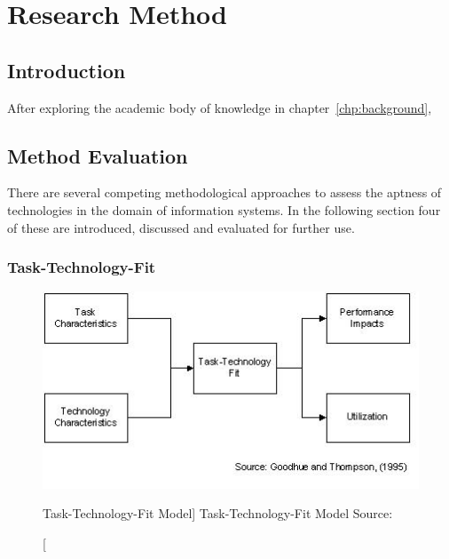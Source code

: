 \chapter{Research Method}\label{chp:researchMethod}


\section{Introduction}

After exploring the academic body of knowledge in chapter~\vref{chp:background}, 


\section{Method Evaluation}

There are several competing methodological approaches to assess the aptness of technologies in the domain of information systems. In the following section four of these are introduced, discussed and evaluated for further use.

    
    \subsection{Task-Technology-Fit}
    \begin{figure}[ht]
        \includegraphics[width=0.7\linewidth]{images/methodology/ttf.jpg}\centering
        \caption
        [Task-Technology-Fit Model]
        {Task-Technology-Fit Model Source: \cite{Goodhue1995Task-TechnologyPerformance}}
    \end{figure}
    
